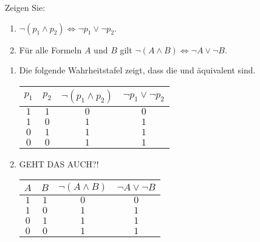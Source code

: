 
\begin{exercise}[18]

Zeigen Sie:

\begin{enumerate}[label = \alph*.]
    \item $\neg (p_1 \land p_2) \Leftrightarrow \neg p_1 \lor \neg p_2$.
    \item Für alle Formeln $A$ und $B$ gilt $\neg (A \land B) \Leftrightarrow \neg A \lor \neg B$.
\end{enumerate}

\end{exercise}


\begin{solution}

\phantom{}

\begin{enumerate}[label = \alph*]

    \item Die folgende Wahrheitstafel zeigt, dass die  und  äquivalent sind. \\

    \begin{tabular}{|c|c|c|c|}
        \hline
        $p_1$ & $p_2$ & $\neg (p_1 \land p_2)$ & $\neg p_1 \lor \neg p_2$ \\
        \hline
        $1$ & $1$ & $0$ & $0$ \\
        \hline
        $1$ & $0$ & $1$ & $1$ \\
        \hline
        $0$ & $1$ & $1$ & $1$ \\
        \hline
        $0$ & $0$ & $1$ & $1$ \\
        \hline
    \end{tabular}

    \item GEHT DAS AUCH?! \\
    
    \begin{tabular}{|c|c|c|c|}
        \hline
        $A$ & $B$ & $\neg (A \land B)$ & $\neg A \lor \neg B$ \\
        \hline
        $1$ & $1$ & $0$ & $0$ \\
        \hline
        $1$ & $0$ & $1$ & $1$ \\
        \hline
        $0$ & $1$ & $1$ & $1$ \\
        \hline
        $0$ & $0$ & $1$ & $1$ \\
        \hline
    \end{tabular}        

\end{enumerate}

\end{solution}

